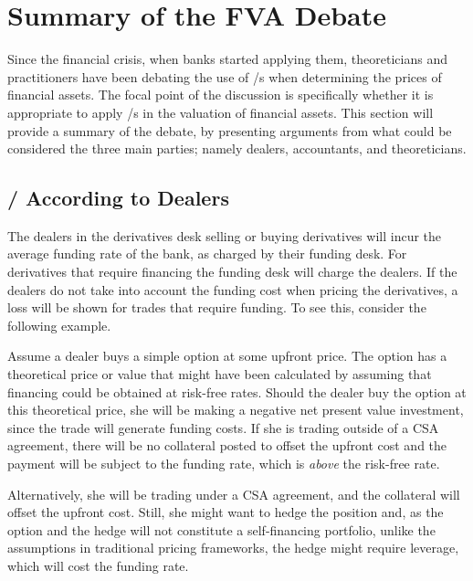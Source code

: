 \documentclass[main.tex]{subfiles}
\begin{document}
    \section{Summary of the FVA Debate}
        Since the financial crisis, when banks started applying them,
        theoreticians and practitioners have been debating the use of \FVA/s
        when determining the prices of financial assets.
        The focal point of the discussion is specifically 
        whether it is appropriate to apply \FVA/s in the valuation of financial assets.
        This section will provide a summary of the debate, 
        by presenting arguments from what could be considered the three main parties;
        namely dealers, accountants, and theoreticians.

        \subsection{\FVA/ According to Dealers}
            The dealers in the derivatives desk selling or buying derivatives 
            will incur the average funding rate of the bank, as charged by their funding desk.
            For derivatives that require financing the funding desk will charge the dealers.
            If the dealers do not take into account the funding cost when pricing the derivatives,
            a loss will be shown for trades that require funding.
            To see this, consider the following example.

            \begin{example}
            Assume a dealer buys a simple option at some upfront price.
            The option has a theoretical price or value that might have been calculated by assuming
            that financing could be obtained at risk-free rates. 
            Should the dealer buy the option at this theoretical price, 
            she will be making a negative net present value investment, 
            since the trade will generate funding costs. 
            If she is trading outside of a CSA agreement, there will be no collateral posted
            to offset the upfront cost and the payment will be subject to the
            funding rate, which is \textit{above} the risk-free rate. 
            
            Alternatively, she will be trading under a CSA agreement,
            and the collateral will offset the upfront cost.
            Still, she might want to hedge the position and, as the option and the hedge
            will not constitute a self-financing portfolio, 
            unlike the assumptions in traditional pricing frameworks,
            the hedge might require leverage, which will cost the funding rate.
            \end{example}
\end{document}
